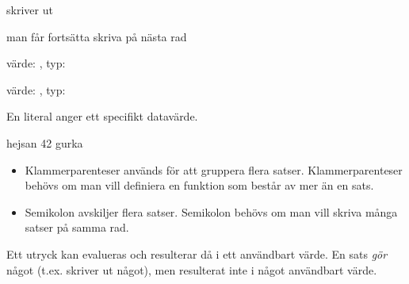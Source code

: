 
\ExerciseSolution{\ExeWeekONE}

\BasicTasks %

\Task %

\Subtask skriver ut 

\Subtask man får fortsätta skriva på nästa rad

\Subtask värde: , typ:  

\Subtask värde: , typ: 

\Task En literal anger ett specifikt datavärde.
 
\Task %

\Subtask  {}

\Subtask  {}

\Subtask  {}

\Subtask  {}

\Subtask  {}

\Subtask  {}

\Subtask  {}

\Subtask  {}

\Subtask  {}

\Subtask  {}

\Subtask  {}

\Task  
\begin{REPLnonum}
hejsan
42
gurka
\end{REPLnonum}
\begin{itemize}[noitemsep,nolistsep]
\item Klammerparenteser används för att gruppera flera satser. Klammerparenteser behövs om man vill definiera en funktion som består av mer än en sats. 

\item Semikolon avskiljer flera satser. Semikolon behövs om man vill skriva många satser på samma rad.
\end{itemize}
\Task %

\Subtask  Ett utryck kan evalueras och resulterar då i ett användbart värde. En sats \emph{gör} något (t.ex. skriver ut något), men resulterat inte i något användbart värde.

\Subtask {}

\Subtask 

